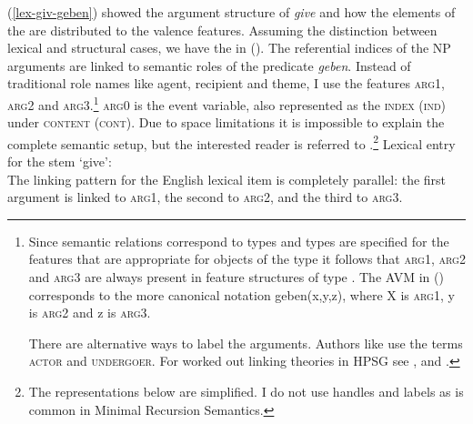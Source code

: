 (\ref{lex-giv-geben}) showed the argument structure of \emph{give} and how the elements of the
\argstl are distributed to the valence features. Assuming the distinction between lexical and
structural cases, we have the \argstv in (). The referential indices of the NP arguments are
linked to semantic roles of the predicate \emph{geben}. Instead of traditional role names like
agent, recipient and theme, I use the features \textsc{arg1}, \textsc{arg2} and
\textsc{arg3}.\footnote{%
Since semantic relations correspond to types and types are specified for the features that are
appropriate for objects of the type it follows that \textsc{arg1}, \textsc{arg2} and \textsc{arg3} are always
present in feature structures of type . The AVM in () corresponds to the more
canonical notation geben(x,y,z), where X is \textsc{arg1}, y is \textsc{arg2} and z is \textsc{arg3}. 

There are alternative ways to label
the arguments. Authors like  use the terms \textsc{actor} and \textsc{undergoer}. For worked out
linking theories in HPSG see ,  and .
}
\textsc{arg0} is the event variable, also represented as the \textsc{index}
(\textsc{ind}) under \textsc{content} (\textsc{cont}). Due to space limitations it is impossible to
explain the complete semantic setup, but the interested reader is referred to
.\footnote{%
  The representations below are simplified. I do not use handles and labels as is common in Minimal
  Recursion Semantics.
}
\eas 
Lexical entry for the stem  `give':\\
\zs
The linking pattern for the English lexical item is completely parallel: the first argument is
linked to \textsc{arg1}, the second to \textsc{arg2}, and the third to \textsc{arg3}.

